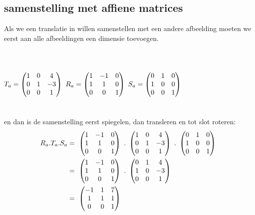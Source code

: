\documentclass[hidelinks, a4wide, 12pt,  twoside]{book}
\begin{document}
\subsection{samenstelling met affiene matrices}
Als we een translatie in \RT willen samenstellen met een andere afbeelding moeten we eerst aan alle afbeeldingen een dimensie toevoegen. \\ \\
  \\ \\ 
$ T_a = \begin{pmatrix}  1 & 0 & 4  \\  0 & 1 & -3  \\ 0 & 0 & 1  \end{pmatrix} $  \qquad
$ R_a = \begin{pmatrix}  1 & -1 & 0  \\  1 & 1 & 0  \\ 0 & 0 & 1  \end{pmatrix} $ \qquad
$ S_a = \begin{pmatrix}  0 & 1 & 0  \\  1 & 0 & 0  \\ 0 & 0 & 1  \end{pmatrix} $ \\ \\ \\
en dan is de samenstelling eerst spiegelen, dan transleren en tot slot roteren:
\begin{align*} 
R_a . T_a . S_a & = \ 
\matdrie{ 1 & -1 & 0 }
{ 1 & 1 & 0 }
{0 & 0 & 1 } \ . \ 
\matdrie{ 1 & 0 & 4 } 
{ 0 & 1 & -3 }
{0 & 0 & 1 } \ . \ 
\matdrie{ 0 & 1 & 0 }  
{ 1 & 0 & 0 }
{0 & 0 & 1 }   \\
& = \ 
\matdrie{ 1 & -1 & 0 }
{ 1 & 1 & 0 }
{0 & 0 & 1 } \ . \ 
\matdrie{ 0 & 1 & 4 }  
{ 1 & 0 & -3 }
{0 & 0 & 1 }   \\
& = \ 
\matdrie{ -1 & 1 & 7 }  
{ 1 & 1 & 1 }
{0 & 0 & 1 }   
\end{align*} 
\end{document}

